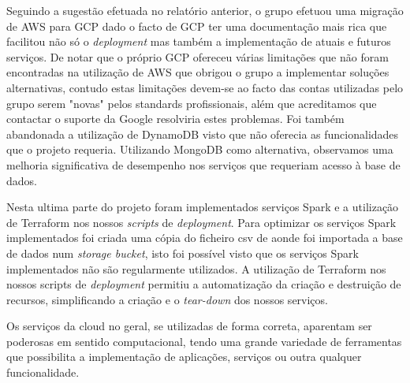 \documentclass[11pt,a4paper]{article}
\begin{document}
Seguindo a sugestão efetuada no relatório anterior, o grupo efetuou uma migração de AWS para GCP dado o facto de GCP ter uma documentação mais rica que facilitou não só o \textit{deployment} mas também a implementação de atuais e futuros serviços. De notar que o próprio GCP ofereceu várias limitações que não foram encontradas na utilização de AWS que obrigou o grupo a implementar soluções alternativas, contudo estas limitações devem-se ao facto das contas utilizadas pelo grupo serem "novas"  pelos standards profissionais, além que acreditamos que contactar o suporte da Google resolviria estes problemas. %
Foi também abandonada a utilização de DynamoDB visto que não oferecia as funcionalidades que o projeto requeria. Utilizando MongoDB como alternativa, observamos uma melhoria significativa de desempenho nos serviços que requeriam acesso à base de dados. 

Nesta ultima parte do projeto foram implementados serviços Spark e a utilização de Terraform nos nossos \textit{scripts} de \textit{deployment}. Para optimizar os serviços Spark implementados foi criada uma cópia do ficheiro csv de aonde foi importada a base de dados num \textit{storage bucket}, isto foi possível visto que os serviços Spark implementados não são regularmente utilizados. A utilização de Terraform nos nossos scripts de \textit{deployment} permitiu a automatização da criação e destruição de recursos, simplificando a criação e o \textit{tear-down} dos nossos serviços.

Os serviços da cloud no geral, se utilizadas de forma correta, aparentam ser poderosas em sentido computacional, tendo uma grande variedade de ferramentas que possibilita a implementação de aplicações, serviços ou outra qualquer funcionalidade.
\end{document}
